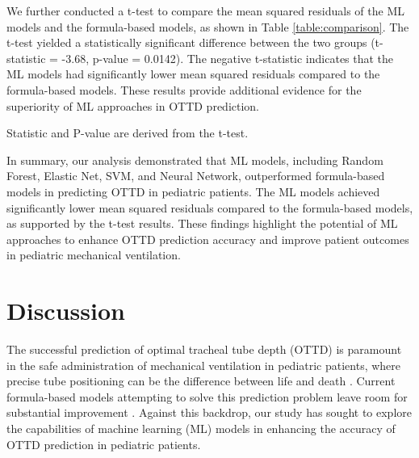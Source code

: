 \documentclass[11pt]{article}
\begin{document}
We further conducted a t-test to compare the mean squared residuals of the ML models and the formula-based models, as shown in Table \ref{table:comparison}. The t-test yielded a statistically significant difference between the two groups (t-statistic = -3.68, p-value = 0.0142). The negative t-statistic indicates that the ML models had significantly lower mean squared residuals compared to the formula-based models. These results provide additional evidence for the superiority of ML approaches in OTTD prediction.

\begin{table}[h]
\caption{T-test comparing Machine Learning and Formula-based Models}
\label{table:comparison}
\begin{threeparttable}
\renewcommand{\TPTminimum}{\linewidth}
\begin{tablenotes}
\footnotesize
\item Statistic and P-value are derived from the t-test.
\end{tablenotes}
\end{threeparttable}
\end{table}


In summary, our analysis demonstrated that ML models, including Random Forest, Elastic Net, SVM, and Neural Network, outperformed formula-based models in predicting OTTD in pediatric patients. The ML models achieved significantly lower mean squared residuals compared to the formula-based models, as supported by the t-test results. These findings highlight the potential of ML approaches to enhance OTTD prediction accuracy and improve patient outcomes in pediatric mechanical ventilation.

\section*{Discussion}

The successful prediction of optimal tracheal tube depth (OTTD) is paramount in the safe administration of mechanical ventilation in pediatric patients, where precise tube positioning can be the difference between life and death \cite{Principi2011ComplicationsOM}. Current formula-based models attempting to solve this prediction problem leave room for substantial improvement \cite{Lee2009BedsidePO}. Against this backdrop, our study has sought to explore the capabilities of machine learning (ML) models in enhancing the accuracy of OTTD prediction in pediatric patients.
\end{document}
